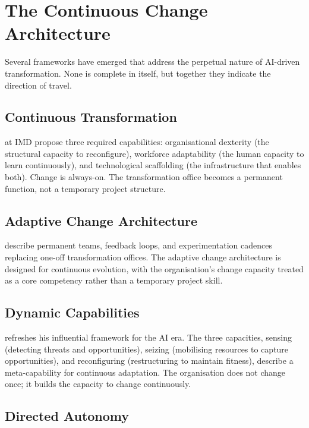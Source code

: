 \section{The Continuous Change Architecture}

Several frameworks have emerged that address the perpetual nature of AI-driven transformation. None is complete in itself, but together they indicate the direction of travel.

\subsection{Continuous Transformation}

\textcite{WadeBonnet2025} at IMD propose three required capabilities: organisational dexterity (the structural capacity to reconfigure), workforce adaptability (the human capacity to learn continuously), and technological scaffolding (the infrastructure that enables both). Change is always-on. The transformation office becomes a permanent function, not a temporary project structure.

\subsection{Adaptive Change Architecture}

\textcite{Deloitte2026} describe permanent teams, feedback loops, and experimentation cadences replacing one-off transformation offices. The adaptive change architecture is designed for continuous evolution, with the organisation's change capacity treated as a core competency rather than a temporary project skill.

\subsection{Dynamic Capabilities}

\textcite{Teece2025} refreshes his influential framework for the AI era. The three capacities, sensing (detecting threats and opportunities), seizing (mobilising resources to capture opportunities), and reconfiguring (restructuring to maintain fitness), describe a meta-capability for continuous adaptation. The organisation does not change once; it builds the capacity to change continuously.

\subsection{Directed Autonomy}

